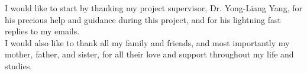 I would like to start by thanking my project supervisor, Dr. Yong-Liang Yang, for his precious help and guidance during this project, and for his lightning fast replies to my emails.\\

I would also like to thank all my family and friends, and most importantly my mother, father, and sister, for all their love and support throughout my life and studies.